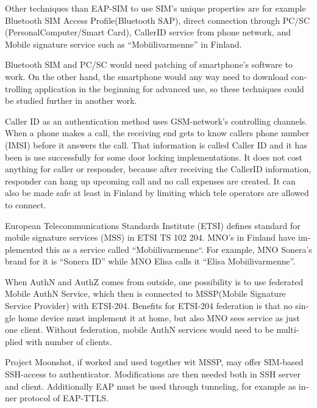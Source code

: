 \documentclass[12pt,a4paper,english]{tutthesis}
\begin{document}
\begin{otherlanguage}{english}
Other techniques than EAP-SIM to use SIM's unique properties
are for example 
Bluetooth SIM Access Profile(Bluetooth  SAP), 
direct connection through PC/SC (Personal\-Computer/Smart\- Card),
CallerID service from phone network, and
Mobile signature service such as ``Mobiilivarmenne'' in Finland.



Bluetooth SIM and PC/SC would need patching of smartphone's software
to work.  On the other hand, the smartphone would any way need to
download controlling application
in the beginning for advanced use, so these techniques could be
studied further in another work.

Caller ID as an authentication method uses GSM-network's controlling
channels. When a phone makes a call, the receiving end gets 
to know callers phone number (IMSI) before it answers the call.
That information is called Caller ID and it has been is use
successfully for some door locking implementations. 
It does not cost anything for caller or responder,
because after receiving the CallerID  information, responder can hang
up upcoming call and no call expenses are created.
 It can also be made safe at least in Finland
by limiting which tele operators are allowed to connect.
















European Telecommunications Standards Institute (ETSI) defines
standard for mobile signature services (MSS) in ETSI TS 102 204.
MNO's in Finland have implemented this as a 
service called ``Mobiilivarmenne``. 
For example, MNO Sonera's brand for  it is ``Sonera ID'' while MNO Elisa calls it
``Elisa Mobiilivarmenne''.

When AuthN and AuthZ comes from outside, one possibility is to use
federated Mobile AuthN Service, which then is connected to MSSP(Mobile
Signature Service Provider) with ETSI-204. Benefits for ETSI-204
federation is that no single home device must implement it at home,
but also MNO sees service as just one client.  Without federation,
mobile AuthN services would need to be multiplied with number of
clients.



Project Moonshot, if worked and used together wit MSSP, may offer
SIM-based SSH-access to authenticator. Modifications are then needed 
both in SSH server and client. Additionally EAP must be used through
tunneling, for example as inner protocol of EAP-TTLS. \cite{moonshot}


\end{otherlanguage}
\end{document}
